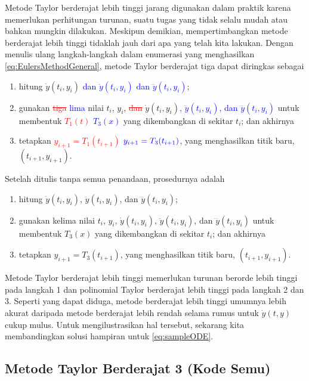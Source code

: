 Metode Taylor berderajat lebih tinggi jarang digunakan dalam praktik
karena memerlukan perhitungan turunan, suatu tugas yang tidak selalu
mudah atau bahkan mungkin dilakukan. Meskipun demikian, mempertimbangkan
metode berderajat lebih tinggi tidaklah jauh dari apa yang telah kita
lakukan. Dengan menulis ulang langkah-langkah dalam enumerasi yang
menghasilkan \ref{eq:EulersMethodGeneral}, metode Taylor berderajat
tiga dapat diringkas sebagai
\begin{enumerate}
\item hitung $\dot{y}(t_{i},y_{i})$ \textcolor{blue}{dan $\ddot{y}(t_{i},y_{i})$
dan $\dddot{y}(t_{i},y_{i})$};
\item gunakan \textcolor{red}{\sout{tiga}} \textcolor{blue}{lima} nilai
$t_{i}$, $y_{i}$, \textcolor{red}{\sout{dan}} $\dot{y}(t_{i},y_{i})$\textcolor{blue}{,
$\ddot{y}(t_{i},y_{i})$, dan $\dddot{y}(t_{i},y_{i})$} untuk membentuk
\textcolor{red}{\sout{\mbox{$T_{1}(t)$}}} \textcolor{blue}{$T_{3}(x)$}
yang dikembangkan di sekitar $t_{i}$; dan akhirnya
\item tetapkan \textcolor{red}{\sout{\mbox{$y_{i+1}=T_{1}(t_{i+1})$}}}
${\color{blue}y_{i+1}=T_{3}(t_{i+1}}\mathclose{\color{blue})}$, yang
menghasilkan titik baru, $(t_{i+1},y_{i+1})$.
\end{enumerate}
Setelah ditulis tanpa semua penandaan, prosedurnya adalah
\begin{enumerate}
\item hitung $\dot{y}(t_{i},y_{i})$, $\ddot{y}(t_{i},y_{i})$, dan $\dddot{y}(t_{i},y_{i})$;
\item gunakan kelima nilai $t_{i}$, $y_{i}$, $\dot{y}(t_{i},y_{i})$,
$\ddot{y}(t_{i},y_{i})$, dan $\dddot{y}(t_{i},y_{i})$ untuk membentuk
$T_{3}(x)$ yang dikembangkan di sekitar $t_{i}$; dan akhirnya
\item tetapkan $y_{i+1}=T_{3}(t_{i+1})$, yang menghasilkan titik baru,
$(t_{i+1},y_{i+1})$.
\end{enumerate}
Metode Taylor berderajat lebih tinggi memerlukan turunan berorde lebih
tinggi pada langkah 1 dan polinomial Taylor berderajat lebih tinggi
pada langkah 2 dan 3. Seperti yang dapat diduga, metode berderajat
lebih tinggi umumnya lebih akurat daripada metode berderajat lebih
rendah selama rumus untuk $\dot{y}(t,y)$ cukup mulus. Untuk mengilustrasikan
hal tersebut, sekarang kita membandingkan solusi hampiran untuk \ref{eq:sampleODE}.

\subsection{Metode Taylor Berderajat 3 (Kode Semu)}

